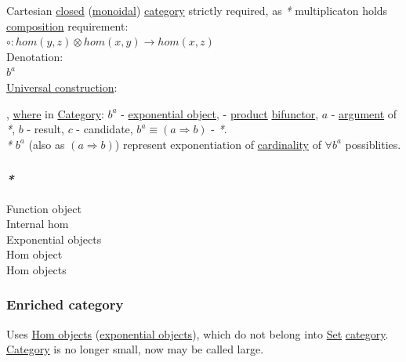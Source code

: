 \documentclass[a4paper,14pt,oneside]{book}
\begin{document}
Cartesian \hyperref[orgcda5e16]{closed} (\hyperref[org94afd7a]{monoidal}) \hyperref[org841d8bc]{category} strictly required, as \emph{*} multiplicaton holds \hyperref[orgb060001]{composition} requirement:\\

\(\circ:hom(y,z) \otimes hom(x,y) \to hom(x,z)\)\\

Denotation:\\
\(b^{a}\)\\

\hyperref[org11d164b]{Universal construction}:\\

, \hyperref[orgd3dc8e4]{where} in \hyperref[org841d8bc]{Category}: \(b^{a}\) - \hyperref[orgce87d4b]{exponential object}, \texttimes{} - \hyperref[org7331b6a]{product} \hyperref[org952346f]{bifunctor}, \(a\) - \hyperref[org8cb9182]{argument} of \emph{*}, \(b\) - result, \(c\) - candidate, \(b^{a} \equiv ( a \Rightarrow b )\) - \emph{*}.\\

\emph{*} \(b^{a}\) (also as \((a \Rightarrow b)\)) represent exponentiation of \hyperref[org1b54c0c]{cardinality} of \(\forall b^{a}\) possiblities.\\

\subsubsection{\emph{*}}
\label{sec:org79f84a2}
\label{org5262c98}Function object\\
\label{orgfaa5a1a}Internal hom\\
\label{orgaa224a9}Exponential objects\\
\label{org72b01b9}Hom object\\
\label{org6fdb871}Hom objects\\

\subsubsection{\label{orgfb1ac4d}Enriched category}
\label{sec:org43dbeaa}
Uses \hyperref[org6fdb871]{Hom objects} (\hyperref[orgaa224a9]{exponential objects}), which do not belong into \hyperref[orge119629]{Set} \hyperref[org841d8bc]{category}.\\
\hyperref[org841d8bc]{Category} is no longer small, now may be called large.\\
\end{document}
